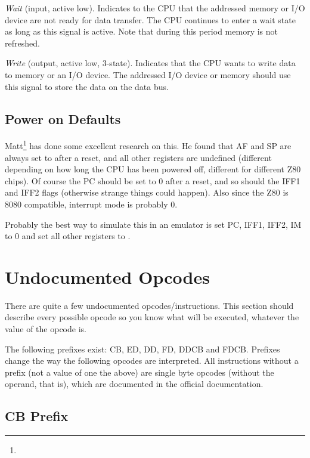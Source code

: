 \documentclass[12pt,twoside,openright,a4paper]{book}
\begin{document}
\begin{description}[leftmargin=1.5em]
	\item[$\mathtt{\overline{WAIT}}$]
	{\em Wait} (input, active low). Indicates to the CPU that the addressed memory or I/O device are not ready for data transfer. The CPU continues to enter a wait state as long as this signal is active. Note that during this period memory is not refreshed.

	\item[$\mathtt{\overline{WR}}$]
	{\em Write} (output, active low, 3-state). Indicates that the CPU wants to write data to memory or an I/O device. The addressed I/O device or memory should use this signal to store the data on the data bus.

\end{description}


\subsection{Power on Defaults}
\label{pon}

Matt\footnote{} has done some excellent research on this. He found that AF and SP are always set to  after a reset, and all other registers are undefined (different depending on how long the CPU has been powered off, different for different Z80 chips). Of course the PC should be set to 0 after a reset, and so should the IFF1 and IFF2 flags (otherwise strange things could happen). Also since the Z80 is 8080 compatible, interrupt mode is probably 0.

Probably the best way to simulate this in an emulator is set PC, IFF1, IFF2, IM to 0 and set all other registers to .


\section{Undocumented Opcodes}

There are quite a few undocumented opcodes/instructions. This section should describe every possible opcode so you know what will be executed, whatever the value of the opcode is.

The following prefixes exist: CB, ED, DD, FD, DDCB and FDCB. Prefixes change the way the following opcodes are interpreted. All instructions without a prefix (not a value of one the above) are single byte opcodes (without the operand, that is), which are documented in the official documentation.


\subsection{CB Prefix \cite{gerton}}
\label{prefix_cb}
\end{document}
